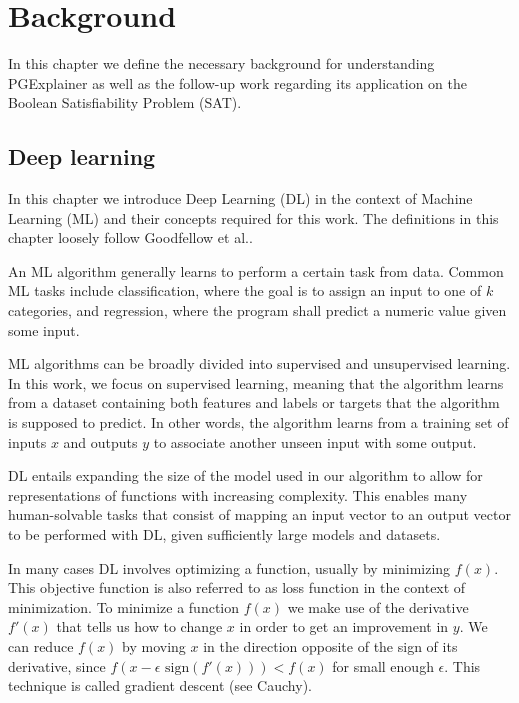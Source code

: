 \chapter{Background}
\label{ch:Background}
In this chapter we define the necessary background for understanding PGExplainer as well as the follow-up work regarding its application on the Boolean Satisfiability Problem (SAT).

\section{Deep learning}
In this chapter we introduce Deep Learning (DL) in the context of Machine Learning (ML) and their concepts required for this work. The definitions in this chapter loosely follow Goodfellow et al.\cite{Goodfellow-et-al-2016}.

An ML algorithm generally learns to perform a certain task from data. Common ML tasks include classification, where the goal is to assign an input to one of $k$ categories, and regression, where the program shall predict a numeric value given some input. 

ML algorithms can be broadly divided into supervised and unsupervised learning. In this work, we focus on supervised learning, meaning that the algorithm learns from a dataset containing both features and labels or targets that the algorithm is supposed to predict. In other words, the algorithm learns from a training set of inputs $x$ and outputs $y$ to associate another unseen input with some output.


DL entails expanding the size of the model used in our algorithm to allow for representations of functions with increasing complexity. This enables many human-solvable tasks that consist of mapping an input vector to an output vector to be performed with DL, given sufficiently large models and datasets.

In many cases DL involves optimizing a function, usually by minimizing $f(x)$. This objective function is also referred to as loss function in the context of minimization. %
To minimize a function $f(x)$ we make use of the derivative $f'(x)$ that tells us how to change $x$ in order to get an improvement in $y$. We can reduce $f(x)$ by moving $x$ in the direction opposite of the sign of its derivative, since $f(x-\epsilon \text{ sign}(f'(x))) < f(x)$ for small enough $\epsilon$. This technique is called gradient descent (see Cauchy\cite{cauchy1847methode}).

